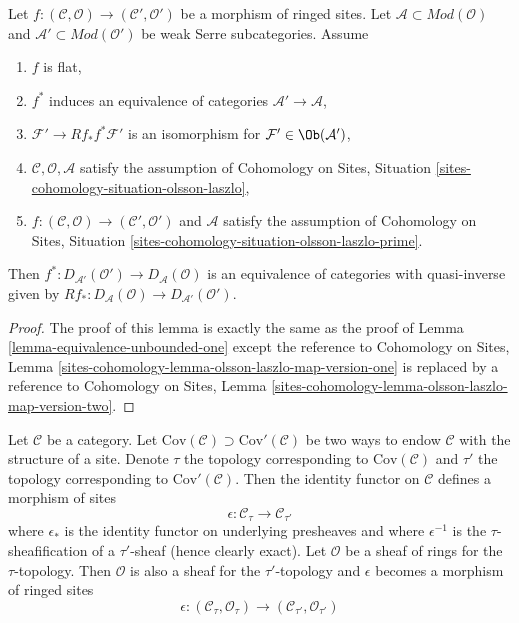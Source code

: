 \begin{lemma}
\label{lemma-equivalence-unbounded-two}
Let $f : (\mathcal{C}, \mathcal{O}) \to (\mathcal{C}', \mathcal{O}')$
be a morphism of ringed sites.
Let $\mathcal{A} \subset \textit{Mod}(\mathcal{O})$
and $\mathcal{A}' \subset \textit{Mod}(\mathcal{O}')$
be weak Serre subcategories. Assume
\begin{enumerate}
\item $f$ is flat,
\item $f^*$ induces an equivalence of categories
$\mathcal{A}' \to \mathcal{A}$,
\item $\mathcal{F}' \to Rf_*f^*\mathcal{F}'$ is an isomorphism
for $\mathcal{F}' \in \Ob(\mathcal{A}')$,
\item $\mathcal{C}, \mathcal{O}, \mathcal{A}$ satisfy the
assumption of
Cohomology on Sites, Situation \ref{sites-cohomology-situation-olsson-laszlo},
\item $f : (\mathcal{C}, \mathcal{O}) \to (\mathcal{C}', \mathcal{O}')$
and $\mathcal{A}$ satisfy the assumption of
Cohomology on Sites, Situation
\ref{sites-cohomology-situation-olsson-laszlo-prime}.
\end{enumerate}
Then $f^* : D_{\mathcal{A}'}(\mathcal{O}') \to D_\mathcal{A}(\mathcal{O})$
is an equivalence of categories with quasi-inverse given by
$Rf_* : D_\mathcal{A}(\mathcal{O}) \to D_{\mathcal{A}'}(\mathcal{O}')$.
\end{lemma}

\begin{proof}
The proof of this lemma is exactly the same as the proof
of Lemma \ref{lemma-equivalence-unbounded-one}
except the reference to
Cohomology on Sites, Lemma
\ref{sites-cohomology-lemma-olsson-laszlo-map-version-one}
is replaced by a reference to
Cohomology on Sites, Lemma
\ref{sites-cohomology-lemma-olsson-laszlo-map-version-two}.
\end{proof}


\noindent
Let $\mathcal{C}$ be a category. Let
$\text{Cov}(\mathcal{C}) \supset \text{Cov}'(\mathcal{C})$
be two ways to endow $\mathcal{C}$ with the structure of a site.
Denote $\tau$ the topology corresponding to $\text{Cov}(\mathcal{C})$
and $\tau'$ the topology corresponding to $\text{Cov}'(\mathcal{C})$.
Then the identity functor on $\mathcal{C}$ defines a morphism
of sites
$$
\epsilon : \mathcal{C}_\tau \longrightarrow \mathcal{C}_{\tau'}
$$
where $\epsilon_*$ is the identity functor on underlying presheaves and
where $\epsilon^{-1}$ is the $\tau$-sheafification of a $\tau'$-sheaf
(hence clearly exact). Let $\mathcal{O}$ be a sheaf of rings for the
$\tau$-topology. Then $\mathcal{O}$ is also a sheaf for the $\tau'$-topology
and $\epsilon$ becomes a morphism of ringed sites
$$
\epsilon :
(\mathcal{C}_\tau, \mathcal{O}_\tau)
\longrightarrow
(\mathcal{C}_{\tau'}, \mathcal{O}_{\tau'})
$$

